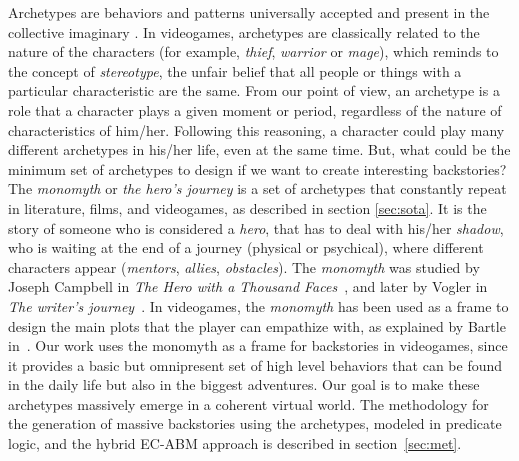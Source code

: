 \documentclass[conference]{IEEEtran}
\begin{document}
Archetypes are behaviors and patterns universally accepted and present in the
collective imaginary \cite{garry2005archetypes}. In videogames, archetypes are classically related to the nature of the characters (for example, \textit{thief}, \textit{warrior} or \textit{mage}), which reminds to the concept of \textit{stereotype}, the unfair belief that all people or things with a particular characteristic are the same. From our point of view, an archetype is a role that a character plays a given moment or period, regardless of the nature of characteristics of him/her. Following this reasoning, a character could play many different archetypes in his/her life, even at the same time. But, what could be the minimum set of archetypes to design if we want to create interesting backstories? The \textit{monomyth} or \textit{the hero's journey} is a set of archetypes that constantly repeat in literature, films, and videogames, as described in section \ref{sec:sota}. It is the story of someone who is considered a \textit{hero}, that has to deal with his/her \textit{shadow}, who is waiting at the end of a journey (physical or psychical), where different characters appear (\textit{mentors}, \textit{allies}, \textit{obstacles}). The \textit{monomyth} was studied by Joseph Campbell in \textit{The Hero with a Thousand Faces}~\cite{joseph1949hero}, and later by Vogler in \textit{The writer's journey}~\cite{vogler2007writer}. In videogames, the \textit{monomyth} has been used as a frame to design the main plots that the player can empathize with, as explained by Bartle in~\cite{bartle2004multihero}. Our work uses the monomyth as a frame for backstories in videogames, since it provides a basic but omnipresent set of high level behaviors that can be found in the daily life but also in the biggest adventures. Our goal is to make these archetypes massively emerge in a coherent virtual world. The methodology for the generation of massive backstories using the archetypes, modeled in predicate logic, and the hybrid EC-ABM approach is described in section~\ref{sec:met}. 
\end{document}
